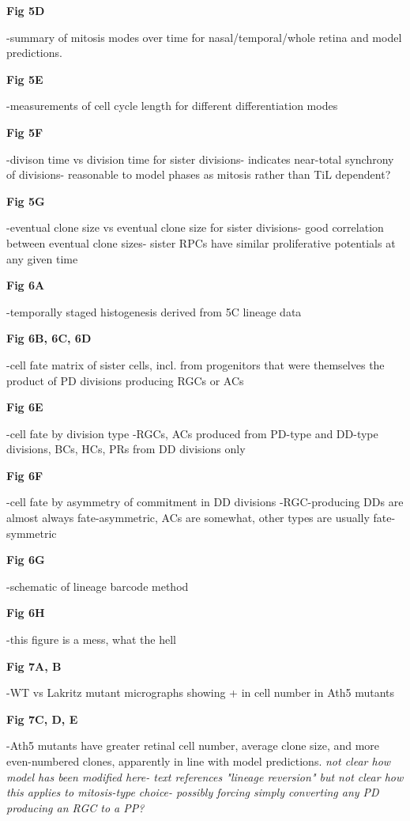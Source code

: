 \textbf{Fig 5D}

-summary of mitosis modes over time for nasal/temporal/whole retina and model predictions.

\textbf{Fig 5E}

-measurements of cell cycle length for different differentiation modes

\textbf{Fig 5F}

-divison time vs division time for sister divisions- indicates near-total synchrony of divisions- reasonable to model phases as mitosis rather than TiL dependent?

\textbf{Fig 5G}

-eventual clone size vs eventual clone size for sister divisions- good correlation between eventual clone sizes- sister RPCs have similar proliferative potentials at any given time

\bigskip

\textbf{Fig 6A}

-temporally staged histogenesis derived from 5C lineage data

\textbf{Fig 6B, 6C, 6D}

-cell fate matrix of sister cells, incl. from progenitors that were themselves the product of PD divisions producing RGCs or ACs

\textbf{Fig 6E}

-cell fate by division type
-RGCs, ACs produced from PD-type and DD-type divisions, BCs, HCs, PRs from DD divisions only

\textbf{Fig 6F}

-cell fate by asymmetry of commitment in DD divisions
-RGC-producing DDs are almost always fate-asymmetric, ACs are somewhat, other types are usually fate-symmetric

\textbf{Fig 6G}

-schematic of lineage barcode method

\textbf{Fig 6H}

-this figure is a mess, what the hell

\bigskip

\textbf{Fig 7A, B}

-WT vs Lakritz mutant micrographs showing + in cell number in Ath5 mutants

\textbf{Fig 7C, D, E}

-Ath5 mutants have greater retinal cell number, average clone size, and more even-numbered clones, apparently in line with model predictions. \textit{not clear how model has been modified here- text references "lineage reversion" but not clear how this applies to mitosis-type choice- possibly forcing simply converting any PD producing an RGC to a PP?}

